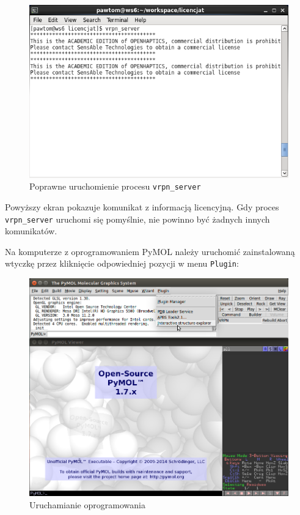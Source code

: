 \documentclass[licencjacka]{pracamgr}
\begin{document}
\begin{figure}[H]
\centering
\includegraphics[scale=0.7,center]{vrpn_start}
\caption{Poprawne uruchomienie procesu \texttt{vrpn\_server}}
\end{figure}

Powyższy ekran pokazuje komunikat z informacją licencyjną. Gdy proces \texttt{vrpn\_server} uruchomi się pomyślnie, nie powinno być żadnych innych komunikatów.

Na komputerze z oprogramowaniem PyMOL należy uruchomić zainstalowaną wtyczkę przez kliknięcie odpowiedniej pozycji w menu \texttt{Plugin}:

\begin{figure}[H]
\centering
\includegraphics[scale=0.4,center]{explorer_run}
\caption{Uruchamianie oprogramowania}
\end{figure}
\end{document}
